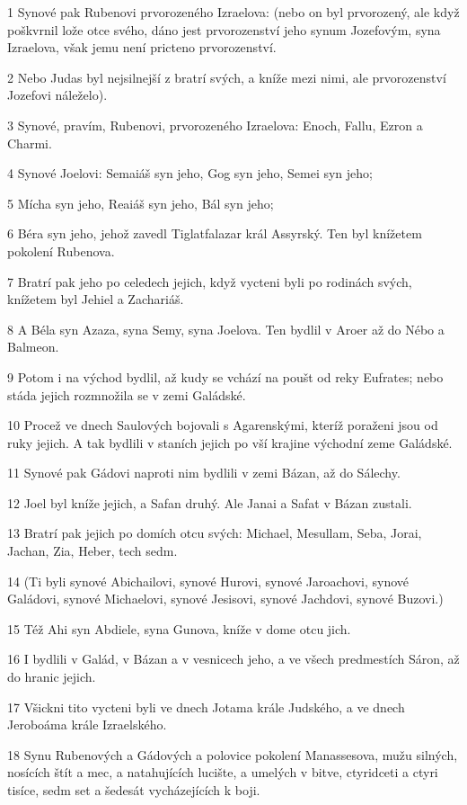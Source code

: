 \par 1 Synové pak Rubenovi prvorozeného Izraelova: (nebo on byl prvorozený, ale když poškvrnil lože otce svého, dáno jest prvorozenství jeho synum Jozefovým, syna Izraelova, však jemu není pricteno prvorozenství.
\par 2 Nebo Judas byl nejsilnejší z bratrí svých, a kníže mezi nimi, ale prvorozenství Jozefovi náleželo).
\par 3 Synové, pravím, Rubenovi, prvorozeného Izraelova: Enoch, Fallu, Ezron a Charmi.
\par 4 Synové Joelovi: Semaiáš syn jeho, Gog syn jeho, Semei syn jeho;
\par 5 Mícha syn jeho, Reaiáš syn jeho, Bál syn jeho;
\par 6 Béra syn jeho, jehož zavedl Tiglatfalazar král Assyrský. Ten byl knížetem pokolení Rubenova.
\par 7 Bratrí pak jeho po celedech jejich, když vycteni byli po rodinách svých, knížetem byl Jehiel a Zachariáš.
\par 8 A Béla syn Azaza, syna Semy, syna Joelova. Ten bydlil v Aroer až do Nébo a Balmeon.
\par 9 Potom i na východ bydlil, až kudy se vchází na poušt od reky Eufrates; nebo stáda jejich rozmnožila se v zemi Galádské.
\par 10 Procež ve dnech Saulových bojovali s Agarenskými, kteríž poraženi jsou od ruky jejich. A tak bydlili v staních jejich po vší krajine východní zeme Galádské.
\par 11 Synové pak Gádovi naproti nim bydlili v zemi Bázan, až do Sálechy.
\par 12 Joel byl kníže jejich, a Safan druhý. Ale Janai a Safat v Bázan zustali.
\par 13 Bratrí pak jejich po domích otcu svých: Michael, Mesullam, Seba, Jorai, Jachan, Zia, Heber, tech sedm.
\par 14 (Ti byli synové Abichailovi, synové Hurovi, synové Jaroachovi, synové Galádovi, synové Michaelovi, synové Jesisovi, synové Jachdovi, synové Buzovi.)
\par 15 Též Ahi syn Abdiele, syna Gunova, kníže v dome otcu jich.
\par 16 I bydlili v Galád, v Bázan a v vesnicech jeho, a ve všech predmestích Sáron, až do hranic jejich.
\par 17 Všickni tito vycteni byli ve dnech Jotama krále Judského, a ve dnech Jeroboáma krále Izraelského.
\par 18 Synu Rubenových a Gádových a polovice pokolení Manassesova, mužu silných, nosících štít a mec, a natahujících lucište, a umelých v bitve, ctyridceti a ctyri tisíce, sedm set a šedesát vycházejících k boji.
